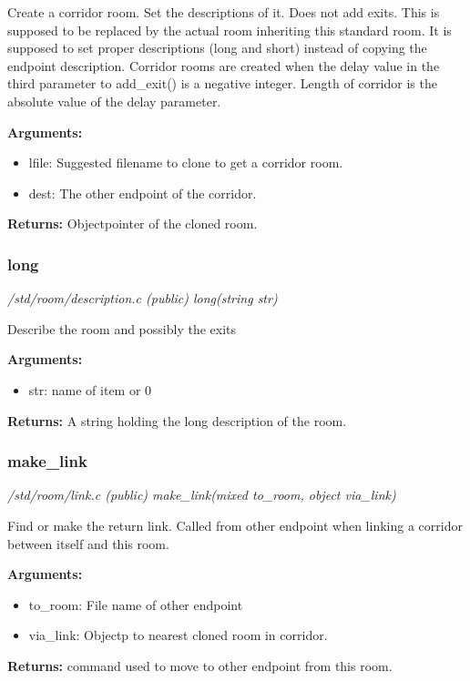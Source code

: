 Create a corridor room. Set the descriptions of it.
Does not add exits. This is supposed to be replaced by 
the actual room inheriting this standard room. It is supposed
to set proper descriptions (long and short) instead of
copying the endpoint description. Corridor rooms are
created when the delay value in the third parameter to
add\_exit() is a negative integer. Length of corridor is
the absolute value of the delay parameter.

{\bf Arguments:}
\begin{itemize}
\item     lfile: Suggested filename to clone to get a corridor room.
\item dest:  The other endpoint of the corridor.
\end{itemize}

{\bf Returns:}        Objectpointer of the cloned room.


\subsubsection{long}

{\em /std/room/description.c (public) long(string str)}

Describe the room and possibly the exits

{\bf Arguments:}
\begin{itemize}
\item     str: name of item or 0
\end{itemize}

{\bf Returns:}        A string holding the long description of the room.


\subsubsection{make\_link}

{\em /std/room/link.c (public) make\_link(mixed to\_room, object via\_link)}

Find or make the return link. Called from other endpoint
when linking a corridor between itself and this room.

{\bf Arguments:}
\begin{itemize}
\item     to\_room:  File name of other endpoint
\item via\_link: Objectp to nearest cloned room in corridor.
\end{itemize}

{\bf Returns:}        command used to move to other endpoint from this room.



